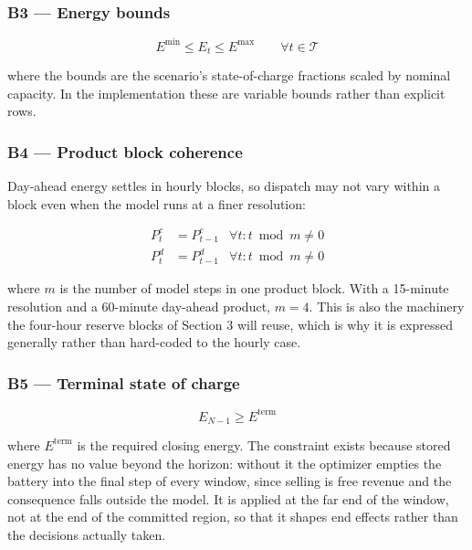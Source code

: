 \documentclass[11pt,a4paper]{article}
\numberwithin{equation}{section}
\begin{document}
\subsubsection*{B3 --- Energy bounds}

\begin{equation}
E^{\min} \le E_{t} \le E^{\max} \qquad \forall t \in \mathcal{T}
\end{equation}

where the bounds are the scenario's state-of-charge fractions scaled by nominal
capacity. In the implementation these are variable bounds rather than explicit
rows.

\subsubsection*{B4 --- Product block coherence}

Day-ahead energy settles in hourly blocks, so dispatch may not vary within a
block even when the model runs at a finer resolution:

\begin{align}
P^{c}_{t} &= P^{c}_{t-1} & \forall t : t \bmod m \ne 0 \\
P^{d}_{t} &= P^{d}_{t-1} & \forall t : t \bmod m \ne 0
\end{align}

where $m$ is the number of model steps in one product block. With a 15-minute
resolution and a 60-minute day-ahead product, $m = 4$. This is also the
machinery the four-hour reserve blocks of Section 3 will reuse, which is why it
is expressed generally rather than hard-coded to the hourly case.

\subsubsection*{B5 --- Terminal state of charge}

\begin{equation}
E_{N-1} \ge E^{\text{term}}
\end{equation}

where $E^{\text{term}}$ is the required closing energy. The constraint exists
because stored energy has no value beyond the horizon: without it the optimizer
empties the battery into the final step of every window, since selling is free
revenue and the consequence falls outside the model. It is applied at the far
end of the window, not at the end of the committed region, so that it shapes end
effects rather than the decisions actually taken.
\end{document}
